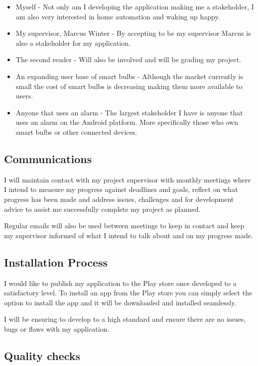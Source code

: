 \begin{itemize}
\item
  Myself - Not only am I developing the application making me a
  stakeholder, I am also very interested in home automation and waking
  up happy.
\item
  My supervisor, Marcus Winter - By accepting to be my supervisor Marcus
  is also a stakeholder for my application.
\item
  The second reader - Will also be involved and will be grading my
  project.
\item
  An expanding user base of smart bulbs - Although the market currently
  is small the cost of smart bulbs is decreasing making them more
  available to users.
\item
  Anyone that uses an alarm - The largest stakeholder I have is anyone
  that uses an alarm on the Android platform. More specifically those
  who own smart bulbs or other connected devices.
\end{itemize}

\subsection{Communications}\label{communications}

I will maintain contact with my project supervisor with monthly meetings
where I intend to measure my progress against deadlines and goals,
reflect on what progress has been made and address issues, challenges
and for development advice to assist me successfully complete my project
as planned.

Regular emails will also be used between meetings to keep in contact and
keep my supervisor informed of what I intend to talk about and on my
progress made.

\subsection{Installation Process}\label{installation-process}

I would like to publish my application to the Play store once developed
to a satisfactory level. To install an app from the Play store you can
simply select the option to install the app and it will be downloaded
and installed seamlessly.

I will be ensuring to develop to a high standard and ensure there are no
issues, bugs or flaws with my application.

\subsection{Quality checks}\label{quality-checks}

